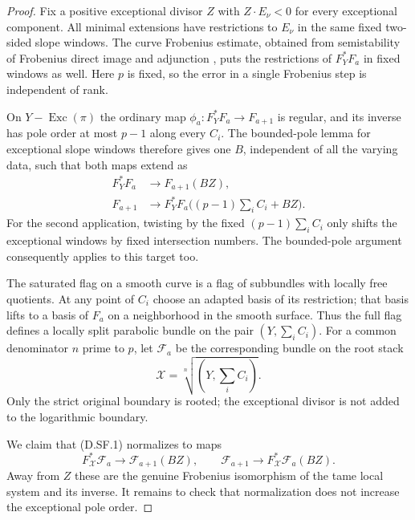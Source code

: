 \begin{proof}
Fix a positive exceptional divisor $Z$ with
$Z\cdot E_\nu<0$ for every exceptional component.
All minimal extensions have restrictions to $E_\nu$
in the same fixed two-sided slope windows.  The curve
Frobenius estimate, obtained from semistability of
Frobenius direct image and adjunction
\citep[Theorem~2.2]{C_Sun2008}
\citep[Proposition~1.3 and its proof]{C_MehtaPauly2007},
puts the restrictions of $F_Y^*F_a$ in fixed windows
as well.  Here $p$ is fixed, so the error in a single
Frobenius step is independent of rank.

On $Y-\operatorname{Exc}(\pi)$ the ordinary map
$\phi_a:F_Y^*F_a\to F_{a+1}$ is regular, and its inverse
has pole order at most $p-1$ along every $C_i$.
The bounded-pole lemma for exceptional slope windows
therefore gives one $B$, independent of all the
varying data, such that both maps extend as
\[
 \begin{split}
 F_Y^*F_a&\longrightarrow F_{a+1}(BZ),\\
 F_{a+1}&\longrightarrow
       F_Y^*F_a\bigl((p-1)\textstyle\sum_i C_i+BZ\bigr).
 \end{split}                                            \tag{D.SF.1}
\]
For the second application, twisting by the fixed
$(p-1)\sum_iC_i$ only shifts the exceptional windows
by fixed intersection numbers.  The bounded-pole
argument consequently applies to this target too.

The saturated flag on a smooth curve is a flag of
subbundles with locally free quotients.  At any point
of $C_i$ choose an adapted basis of its restriction;
that basis lifts to a basis of $F_a$ on a neighborhood
in the smooth surface.  Thus the full flag defines
a locally split parabolic bundle on the pair
$(Y,\sum_iC_i)$.  For a common denominator $n$ prime
to $p$, let $\mathcal F_a$ be the corresponding
bundle on the root stack
\[
                \mathcal X=\sqrt[n]{(Y,\sum_i C_i)}.
\]
Only the strict original boundary is rooted;
the exceptional divisor is not added to the logarithmic
boundary.

We claim that (D.SF.1) normalizes to maps
\[
 F_{\mathcal X}^*\mathcal F_a
        \longrightarrow\mathcal F_{a+1}(BZ),\qquad
 \mathcal F_{a+1}
        \longrightarrow F_{\mathcal X}^*\mathcal F_a(BZ).
                                                        \tag{D.SF.2}
\]
Away from $Z$ these are the genuine Frobenius
isomorphism of the tame local system and its inverse.
It remains to check that normalization does not
increase the exceptional pole order.


\end{proof}
